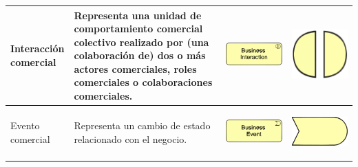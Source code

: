\begin{longtable}{|p{0.15\linewidth}|p{0.45\linewidth}|p{0.2\linewidth} p{0.2\linewidth}|}
    Interacción comercial
    &
    Representa una unidad de comportamiento comercial colectivo realizado por (una  colaboración de) dos o más actores comerciales, roles comerciales o colaboraciones comerciales.
    &
\begin{center}
    \includegraphics[width=1\linewidth]{imgs/capa_de_negocios/7.pdf}
\end{center} &
\begin{center}
    \includegraphics[width=0.5\linewidth]{imgs/capa_de_negocios/a7.pdf}
\end{center}
    \\ \hline


    Evento comercial
    &
    Representa un cambio de estado relacionado con el negocio.
    &
\begin{center}
    \includegraphics[width=1\linewidth]{imgs/capa_de_negocios/8.pdf}
\end{center} &
\begin{center}
    \includegraphics[width=0.5\linewidth]{imgs/capa_de_negocios/a8.pdf}
\end{center}
    \\ \hline


\end{longtable}
